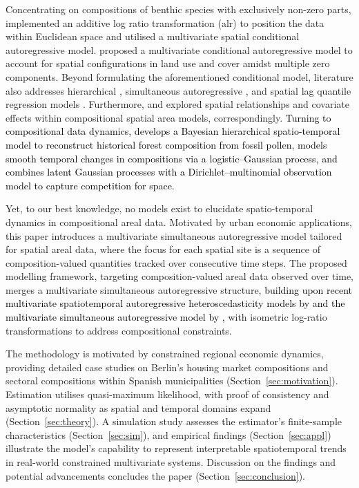 \documentclass[12pt]{article}
\theoremstyle{plain}
\theoremstyle{definition}
\begin{document}
Concentrating on compositions of benthic species with exclusively non-zero parts, \cite{Billheimer1997} implemented an additive log ratio transformation (alr) \citep{10.5555/17272} to position the data within Euclidean space and utilised a multivariate spatial conditional autoregressive model. \cite{Leininger2013} proposed a multivariate conditional autoregressive model to account for spatial configurations in land use and cover amidst multiple zero components. Beyond formulating the aforementioned conditional model, literature also addresses hierarchical \citep{PIRZAMANBEIN201814}, simultaneous autoregressive \citep{Nguyen03042021}, and spatial lag quantile regression models \citep{Zhao11122024}. Furthermore, \cite{Yoshida2018} and \cite{Laurent2023} explored spatial relationships and covariate effects within compositional spatial area models, correspondingly. \textcolor{black}{Turning to compositional data dynamics, \cite{Paciorek2009} develops a Bayesian hierarchical spatio-temporal model to reconstruct historical forest composition from fossil pollen, \cite{Mastrantonio2019} models smooth temporal changes in compositions via a logistic–Gaussian process, and \cite{Kettunen2024} combines latent Gaussian processes with a Dirichlet–multinomial observation model to capture competition for space.}

Yet, to our best knowledge, no models exist to elucidate spatio-temporal dynamics in compositional areal data. Motivated by urban economic applications, this paper introduces a multivariate simultaneous autoregressive model tailored for spatial areal data, where the focus for each spatial site is a sequence of composition-valued quantities tracked over consecutive time steps. The proposed modelling framework, targeting composition-valued areal data observed over time, merges a multivariate simultaneous autoregressive structure, \textcolor{black}{building upon recent multivariate spatiotemporal autoregressive heteroscedasticity models by \cite{otto2024multivariate} and the multivariate simultaneous autoregressive model by \cite{Kelejian1998},} with isometric log-ratio transformations to address compositional constraints. 

The methodology is motivated by constrained regional economic dynamics, providing detailed case studies on Berlin's housing market compositions and sectoral compositions within Spanish municipalities (Section~\ref{sec:motivation}). Estimation utilises quasi-maximum likelihood, with proof of consistency and asymptotic normality as spatial and temporal domains expand (Section~\ref{sec:theory}). A simulation study assesses the estimator's finite-sample characteristics (Section~\ref{sec:sim}), and empirical findings (Section~\ref{sec:appl}) illustrate the model’s capability to represent interpretable spatiotemporal trends in real-world constrained multivariate systems. Discussion on the findings and potential advancements concludes the paper (Section~\ref{sec:conclusion}).
\end{document}
